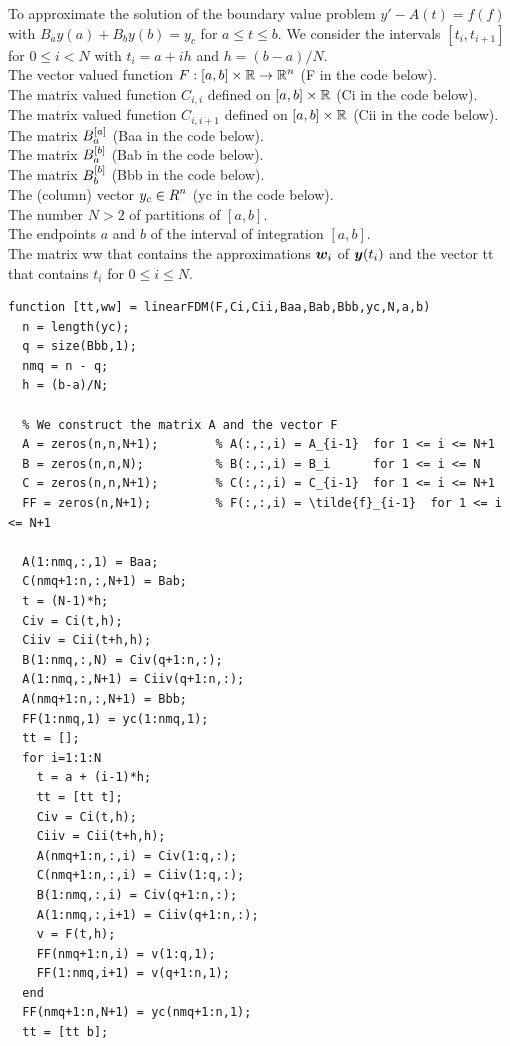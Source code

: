 \begin{code}
To approximate the solution of the boundary value problem
$y' - A(t) = f(f)$ with $B_a y(a) + B_b y(b) = y_c$  for $a \leq t \leq b$.
We consider the intervals $[t_i,t_{i+1}]$ for $0 \leq i < N$ with
$t_i = a + i h$ and $h = (b-a)/N$.\\
 The vector valued function
$\displaystyle F:[a,b] \times \mathbb{R} \to \mathbb{R}^n$
(F in the code below).\\
The \nn matrix valued function $C_{i,i}$ defined on $[a,b] \times \mathbb{R}$
(Ci in the code below).\\
The \nn matrix valued function $C_{i,i+1}$ defined on $[a,b] \times
\mathbb{R}$ (Cii in the code below).\\
The  matrix $\displaystyle B_a^{[a]}$ (Baa in the code below).\\
The  matrix $\displaystyle B_a^{[b]}$ (Bab in the code below).\\
The  matrix $\displaystyle B_b^{[b]}$ (Bbb in the code below).\\
The (column) vector $\displaystyle y_c \in R^n$ (yc in the code below).\\
The number $N>2$ of partitions of $[a,b]$.\\
The endpoints $a$ and $b$ of the interval of integration $[a,b]$.\\
 The  matrix ww that contains the approximations
$\bm{w}_i$ of $\bm{y}(t_i)$ and the vector tt that contains $t_i$
for $0 \leq i \leq N$.
\small
\begin{verbatim}
function [tt,ww] = linearFDM(F,Ci,Cii,Baa,Bab,Bbb,yc,N,a,b)
  n = length(yc);
  q = size(Bbb,1);
  nmq = n - q;
  h = (b-a)/N;
    
  % We construct the matrix A and the vector F
  A = zeros(n,n,N+1);        % A(:,:,i) = A_{i-1}  for 1 <= i <= N+1
  B = zeros(n,n,N);          % B(:,:,i) = B_i      for 1 <= i <= N
  C = zeros(n,n,N+1);        % C(:,:,i) = C_{i-1}  for 1 <= i <= N+1
  FF = zeros(n,N+1);         % F(:,:,i) = \tilde{f}_{i-1}  for 1 <= i <= N+1

  A(1:nmq,:,1) = Baa;
  C(nmq+1:n,:,N+1) = Bab;
  t = (N-1)*h;
  Civ = Ci(t,h);
  Ciiv = Cii(t+h,h);
  B(1:nmq,:,N) = Civ(q+1:n,:);
  A(1:nmq,:,N+1) = Ciiv(q+1:n,:);
  A(nmq+1:n,:,N+1) = Bbb;
  FF(1:nmq,1) = yc(1:nmq,1);
  tt = [];
  for i=1:1:N
    t = a + (i-1)*h;
    tt = [tt t];
    Civ = Ci(t,h);
    Ciiv = Cii(t+h,h);
    A(nmq+1:n,:,i) = Civ(1:q,:);
    C(nmq+1:n,:,i) = Ciiv(1:q,:);
    B(1:nmq,:,i) = Civ(q+1:n,:);
    A(1:nmq,:,i+1) = Ciiv(q+1:n,:);
    v = F(t,h);
    FF(nmq+1:n,i) = v(1:q,1); 
    FF(1:nmq,i+1) = v(q+1:n,1); 
  end
  FF(nmq+1:n,N+1) = yc(nmq+1:n,1);
  tt = [tt b];


\end{verbatim}
\end{code}
